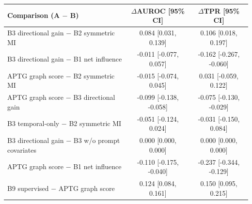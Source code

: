 \begin{tabular}{lcc}
\toprule
Comparison (A $-$ B) & $\Delta$AUROC [95\% CI] & $\Delta$TPR [95\% CI] \\
\midrule
B3 directional gain $-$ B2 symmetric MI & 0.084 [0.031, 0.139] & 0.106 [0.018, 0.197] \\
B3 directional gain $-$ B1 net influence & -0.011 [-0.077, 0.057] & -0.162 [-0.267, -0.060] \\
APTG graph score $-$ B2 symmetric MI & -0.015 [-0.074, 0.045] & 0.031 [-0.059, 0.122] \\
APTG graph score $-$ B3 directional gain & -0.099 [-0.138, -0.058] & -0.075 [-0.130, -0.029] \\
B3 temporal-only $-$ B2 symmetric MI & -0.051 [-0.124, 0.024] & -0.031 [-0.150, 0.084] \\
B3 directional gain $-$ B3 w/o prompt covariates & 0.000 [0.000, 0.000] & 0.000 [0.000, 0.000] \\
APTG graph score $-$ B1 net influence & -0.110 [-0.175, -0.040] & -0.237 [-0.344, -0.129] \\
B9 supervised $-$ APTG graph score & 0.124 [0.084, 0.161] & 0.150 [0.095, 0.215] \\
\bottomrule
\end{tabular}